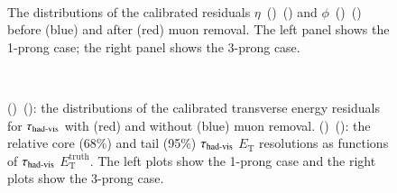         \begin{figure}[hbtp]
            \begin{center}
                \\
                \caption{The distributions of the calibrated residuals 
                    $\eta$~(\protect{})~(\protect{}) and 
                    $\phi$~(\protect{})~(\protect{}) 
                    before (blue) and after (red) muon removal. The left panel shows the 1-prong case; the right 
                    panel shows the 3-prong case.}
                \label{fig:murm:sp_resolutions}
            \end{center}
        \end{figure}
        \begin{figure}[hbtp]
            \begin{center}
                \\
                \caption{(\protect{})~(\protect{}): the distributions of the calibrated transverse energy 
                residuals for $\tau_{\text{had-vis}}$ with (red) and without (blue) muon removal. 
                (\protect{})~(\protect{}): the relative core (68\%) and tail (95\%) 
                $\tau_{\text{had-vis}}$ $E_\mathrm{T}$ resolutions as functions of $\tau_{\text{had-vis}}$ $E_\mathrm{T}^\mathrm{truth}$. The left 
                plots show the 1-prong case and the right plots show the 3-prong case.}
                \label{fig:murm:e_resolutions}
            \end{center}
        \end{figure}

